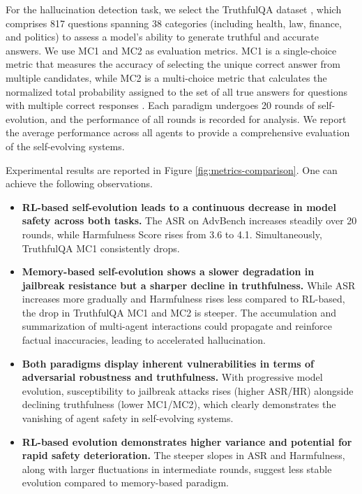 \documentclass{article}
\theoremstyle{definition}
\theoremstyle{plain}
\begin{document}
For the hallucination detection task, we select the TruthfulQA dataset \cite{lin2022truthfulqa}, which comprises 817 questions spanning 38 categories (including health, law, finance, and politics) to assess a model's ability to generate truthful and accurate answers. We use MC1 and MC2 as evaluation metrics. MC1 is a single-choice metric that measures the accuracy of selecting the unique correct answer from multiple candidates, while MC2 is a multi-choice metric that calculates the normalized total probability assigned to the set of all true answers for questions with multiple correct responses \cite{lin2022truthfulqa}. 
Each paradigm undergoes 20 rounds of self-evolution, and the performance of all rounds is recorded for analysis. We report the average performance across all agents to provide a comprehensive evaluation of the self-evolving systems.

Experimental results are reported in Figure \ref{fig:metrics-comparison}. One can achieve the following observations. 
\begin{itemize}
    \item \textbf{RL-based self-evolution leads to a continuous decrease in model safety across both tasks.} The ASR on AdvBench  increases steadily over 20 rounds, while Harmfulness Score rises from 3.6 to 4.1. Simultaneously, TruthfulQA MC1 consistently drops.

    \item \textbf{Memory-based self-evolution shows a slower degradation in jailbreak resistance but a sharper decline in truthfulness.} While ASR increases more gradually and Harmfulness rises less compared to RL-based, the drop in TruthfulQA MC1 and MC2 is steeper. The accumulation and summarization of multi-agent interactions could propagate and reinforce factual inaccuracies, leading to accelerated hallucination.

    \item \textbf{Both paradigms display inherent vulnerabilities in terms of adversarial robustness and truthfulness.} With progressive model evolution, susceptibility to jailbreak attacks rises (higher ASR/HR) alongside declining truthfulness (lower MC1/MC2), which clearly demonstrates the vanishing of agent safety in self-evolving systems.

    \item \textbf{RL-based evolution demonstrates higher variance and potential for rapid safety deterioration.} The steeper slopes in ASR and Harmfulness, along with larger fluctuations in intermediate rounds, suggest less stable evolution compared to memory-based paradigm.
\end{itemize}
\end{document}
